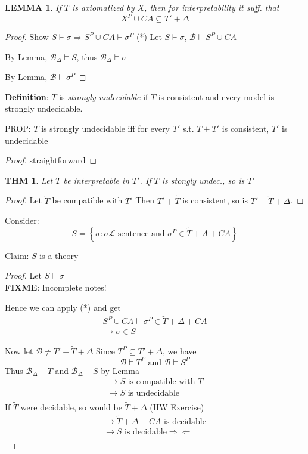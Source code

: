 \documentclass[12pt]{article}
\newcommand{\proves}{\vdash}
\newcommand{\defn}{\textbf{Definition}: }
\newcommand{\fixme}{\\ \textbf{FIXME}: Incomplete notes!}
\begin{document}
\newtheorem*{lem}{LEMMA}
\begin{lem}
  If $T$ is axiomatized by $X$, then for interpretability it suff. that
  \[
X^P \cup CA \subseteq T' + \Delta
  \]
\end{lem}
\begin{proof}
Show $S \proves \sigma \Rightarrow S^P \cup CA \proves \sigma^P$ (*)
Let $S \proves \sigma$, $\mathcal{B} \models S^P \cup CA$
  
By Lemma, $\mathcal{B}_\Delta \models S$, thus $\mathcal{B}_\Delta \models \sigma$

By Lemma, $\mathcal{B} \models \sigma^P$
\end{proof}
\defn $T$ is \emph{strongly undecidable} if $T$ is consistent
and every model is strongly undecidable.

PROP: $T$ is strongly undecidable iff for every $T'$ s.t. $T + T'$ is consistent,
$T'$ is undecidable
\begin{proof}
  straightforward
\end{proof}

\newtheorem{thm}{THM}
\begin{thm}
  Let $T$ be interpretable in $T'$.
  If $T$ is stongly undec., so is $T'$
\end{thm}
\begin{proof}
  Let $\widetilde{T}$ be compatible with $T'$
  Then $T' + \widetilde{T}$ is consistent, so is $T' + \widetilde{T} + \Delta$.
\end{proof}

  Consider:
  \[
  S = \left\{ \sigma : \sigma \text{$\mathcal{L}$-sentence and } \sigma^P \in \widetilde{T} + A + CA \right\}
  \]

  Claim: $S$ is a theory
\begin{proof}
  Let $S \proves \sigma$
  \fixme

  Hence we can apply (*) and get
  \begin{align*}
    S^P \cup CA \models \sigma^P \in \widetilde{T} + \Delta + CA \\
    \rightarrow \sigma \in S
  \end{align*}

  Now let $\mathcal{B} \ne T' + \widetilde{T} + \Delta$
  Since $T^P \subseteq T' + \Delta$, we have
  \[
  \mathcal{B} \models T^P \text{ and } \mathcal{B} \models S^P
  \]
  Thus $\mathcal{B}_\Delta \models T$ and $\mathcal{B}_\Delta \models S$
  by Lemma
\begin{align*}
  \rightarrow S \text{ is compatible with } T \\
  \rightarrow S \text{ is undecidable} \\
\end{align*}
If $\widetilde{T}$ were decidable, so would be $\widetilde{T} + \Delta$
(HW Exercise)
\begin{align*}
  \rightarrow \widetilde{T} + \Delta + CA \text{ is decidable} \\
  \rightarrow S \text{ is decidable} \Rightarrow\Leftarrow \\
\end{align*}
\end{proof}
\end{document}
